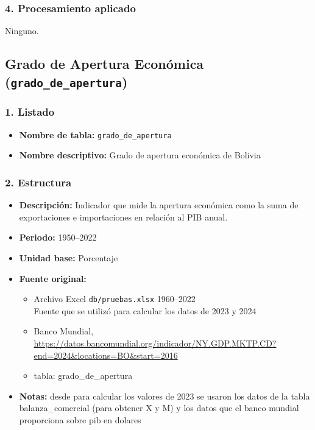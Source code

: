 \documentclass[12pt,a4paper]{article}
\begin{document}
\subsubsection*{4. Procesamiento aplicado}
Ninguno.

\newpage
\subsection{Grado de Apertura Económica (\texttt{grado\_de\_apertura})}

\subsubsection*{1. Listado}
\begin{itemize}
  \item \textbf{Nombre de tabla:} \texttt{grado\_de\_apertura}
  \item \textbf{Nombre descriptivo:} Grado de apertura económica de Bolivia
\end{itemize}

\subsubsection*{2. Estructura}
\begin{itemize}
  \item \textbf{Descripción:} Indicador que mide la apertura económica como la suma de exportaciones e importaciones en relación al PIB anual.
  \item \textbf{Periodo:} 1950--2022
  \item \textbf{Unidad base:} Porcentaje
  \item \textbf{Fuente original:} 
    \begin{itemize}
    \item Archivo Excel \texttt{db/pruebas.xlsx} 1960--2022 \\

    Fuente que se utilizó para calcular los datos de 2023 y 2024\\
    \item Banco Mundial, \url{https://datos.bancomundial.org/indicador/NY.GDP.MKTP.CD?end=2024&locations=BO&start=2016}
    \item tabla: grado\_de\_apertura
    \end{itemize}
  \item \textbf{Notas:} desde para calcular los valores de 2023 se usaron los datos de la tabla balanza\_comercial (para obtener X y M) y los datos que el banco mundial proporciona sobre pib en dolares
\end{itemize}
\end{document}
